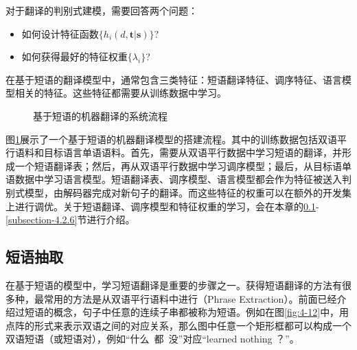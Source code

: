 \parinterval 对于翻译的判别式建模，需要回答两个问题：

\begin{itemize}
\vspace{0.5em}
\item 如何设计特征函数$\{h_i(d,\mathbf{t}|\mathbf{s})\}$?
\vspace{0.5em}
\item 如何获得最好的特征权重$\{\lambda_i\}$?
\vspace{0.5em}
\end{itemize}

在基于短语的翻译模型中，通常包含三类特征：短语翻译特征、调序特征、语言模型相关的特征。这些特征都需要从训练数据中学习。

\begin{figure}[htp]
\centering

\caption{基于短语的机器翻译的系统流程}
\label{fig:4-11}
\end{figure}

\parinterval 图\ref{fig:4-11}展示了一个基于短语的机器翻译模型的搭建流程。其中的训练数据包括双语平行语料和目标语言单语语料。首先，需要从双语平行数据中学习短语的翻译，并形成一个短语翻译表；然后，再从双语平行数据中学习调序模型；最后，从目标语单语数据中学习语言模型。短语翻译表、调序模型、语言模型都会作为特征被送入判别式模型，由解码器完成对新句子的翻译。而这些特征的权重可以在额外的开发集上进行调优。关于短语翻译、调序模型和特征权重的学习，会在本章的\ref{subsection-4.2.3}-\ref{subsection-4.2.6}节进行介绍。


\subsection{短语抽取}\label{subsection-4.2.3}

\parinterval 在基于短语的模型中，学习短语翻译是重要的步骤之一。获得短语翻译的方法有很多种，最常用的方法是从双语平行语料中进行{\small{}}（Phrase Extraction）。前面已经介绍过短语的概念，句子中任意的连续子串都被称为短语。例如在图\ref{fig:4-12}中，用点阵的形式来表示双语之间的对应关系，那么图中任意一个矩形框都可以构成一个双语短语（或短语对），例如``什么\ 都\ 没''对应``learned nothing ？''。

